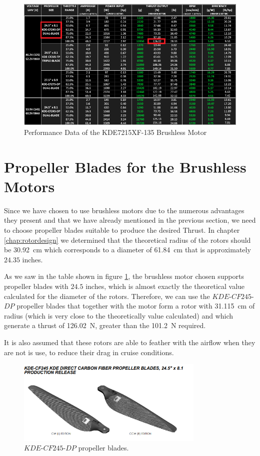 \documentclass[english,fira]{ist-report}
\begin{document}
\begin{figure}[ht]
    \centering
    \includegraphics[width=\textwidth]{graphics/BrushlessMotorsforVtol/z.png}
    \caption{Performance Data of the KDE7215XF-135 Brushless Motor}
    \label{fig:performancekde}
\end{figure}
\newpage 
\section{Propeller Blades for the Brushless Motors}
Since we have chosen to use brushless motors due to the numerous advantages they present and that we have already mentioned in the previous section, we need to choose propeller blades suitable to produce the desired Thrust. In chapter \ref{chap:rotordesign} we determined that the theoretical radius of the rotors should be \SI{30.92}{\centi\meter} which corresponds to a diameter of \SI{61.84}{\centi\meter} that is approximately $24.35$ inches. \par
As we saw in the table shown in figure \ref{fig:performancekde}, the brushless motor chosen supports propeller blades with $24.5$ inches, which is almost exactly the theoretical value calculated for the diameter of the rotors. Therefore, we can use the $KDE$-$CF245$-$DP$ propeller blades that together with the motor form a rotor with \SI{31.115}{\centi\meter} of radius (which is very close to the theoretically value calculated) and which generate a thrust of \SI{126.02}{\newton}, greater than the \SI{101.2}{\newton} required. 

It is also assumed that these rotors are able to feather with the airflow when they are not is use, to reduce their drag in cruise conditions. 

\begin{figure}[ht]
    \centering
    \includegraphics[width=0.8\textwidth]{graphics/BrushlessMotorsforVtol/propellerblades.png}
    \caption{$KDE$-$CF245$-$DP$ propeller blades.}
    \label{fig:propblades}
\end{figure}
\end{document}

